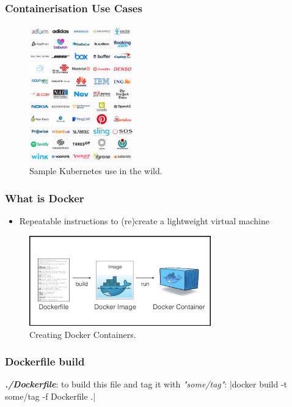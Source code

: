 \documentclass{beamer}
\begin{document}
  \begin{frame}
    \frametitle{Containerisation Use Cases}
    \begin{figure}[th!]
      \centering
      \includegraphics[width=0.4\textwidth]{kube_case_studies.png}
      \caption{Sample Kubernetes use in the wild. \autocite{kube_cases}}
      \label{fig:kube_use}
    \end{figure}
  \end{frame}

  \begin{frame}
    \frametitle{What is Docker}
    \begin{itemize}
        \item Repeatable instructions to (re)create a lightweight virtual machine
    \end{itemize}
    \begin{figure}[th!]
      \centering
      \includegraphics[width=0.7\textwidth]{docker_process.png}
      \caption{Creating Docker Containers. \autocite{docker_build}}
      \label{fig:docker_build}
    \end{figure}
  \end{frame}

  \begin{frame}
    \frametitle{Dockerfile build}
    \textbf{\textit{./Dockerfile}}:
    to build this file and tag it with \textit{"some/tag"}:
    |docker build -t some/tag -f Dockerfile .|
  \end{frame}
\end{document}
